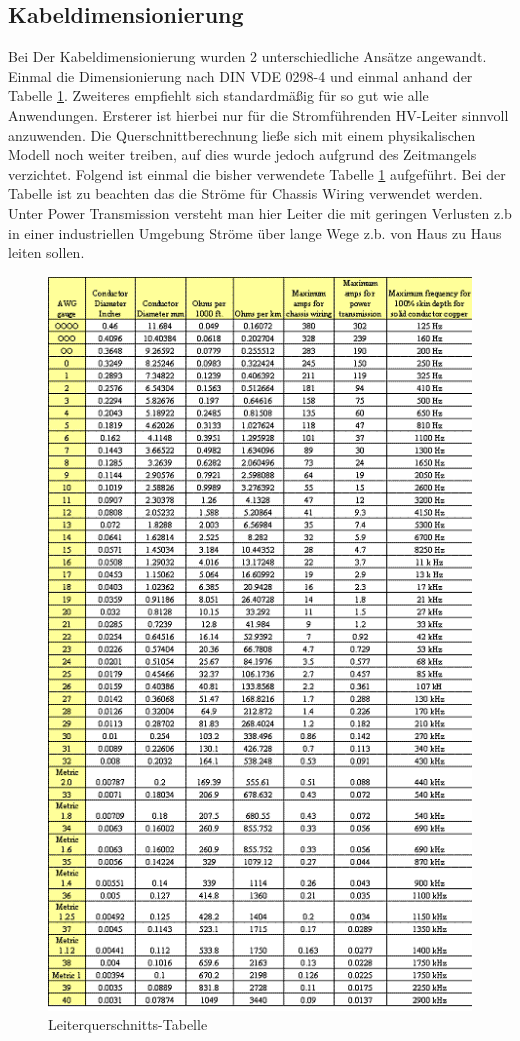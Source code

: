 \subsection{Kabeldimensionierung}
Bei Der Kabeldimensionierung wurden 2 unterschiedliche Ansätze angewandt. Einmal die Dimensionierung nach DIN VDE 0298-4 \cite{DIN VDE 0298-4} und einmal anhand der Tabelle \ref{fig:wire-thickness}. Zweiteres empfiehlt sich standardmäßig für so gut wie alle Anwendungen. Ersterer ist hierbei nur für die Stromführenden \ac{HV}-Leiter sinnvoll anzuwenden. Die Querschnittberechnung ließe sich mit einem physikalischen Modell noch weiter treiben, auf dies wurde jedoch aufgrund des Zeitmangels verzichtet.
Folgend ist einmal die bisher verwendete Tabelle \ref{fig:wire-thickness} aufgeführt.
Bei der Tabelle ist zu beachten das die Ströme für Chassis Wiring verwendet werden. Unter Power Transmission versteht man hier Leiter die mit geringen Verlusten z.b in einer industriellen Umgebung Ströme über lange Wege z.b. von Haus zu Haus leiten sollen.
\begin{figure}[h]
	\centering
	\includegraphics[width=0.7\linewidth]{"bilder/Wire thickness"}
	\caption{Leiterquerschnitts-Tabelle \cite{Technology2022}}
	\label{fig:wire-thickness}
\end{figure}

